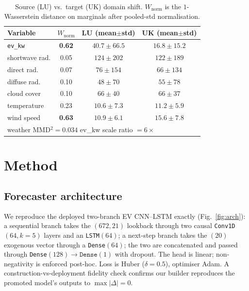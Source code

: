 \documentclass[conference]{IEEEtran}
\begin{document}
\begin{table}[t]
\centering
\caption{Source (LU) vs.\ target (UK) domain shift. $W_{\mathrm{norm}}$ is the
$1$-Wasserstein distance on marginals after pooled-std normalisation.}
\label{tab:domain}
\begin{tabular}{lccc}
\toprule
Variable & $W_{\mathrm{norm}}$ & LU (mean$\pm$std) & UK (mean$\pm$std)\\
\midrule
\texttt{ev\_kw}            & \textbf{0.62} & $40.7\pm66.5$ & $16.8\pm15.2$\\
shortwave rad.             & 0.05 & $124\pm202$ & $122\pm189$\\
direct rad.                & 0.07 & $76\pm154$  & $66\pm134$\\
diffuse rad.               & 0.10 & $48\pm70$   & $55\pm78$\\
cloud cover                & 0.10 & $66\pm40$   & $66\pm37$\\
temperature                & 0.23 & $10.6\pm7.3$& $11.2\pm5.9$\\
wind speed                 & \textbf{0.63} & $10.9\pm6.1$& $15.6\pm7.8$\\
\midrule
\multicolumn{4}{l}{weather MMD$^2=0.034$ \quad ev\_kw scale ratio $=6\times$}\\
\bottomrule
\end{tabular}
\end{table}

\section{Method}
\subsection{Forecaster architecture}
We reproduce the deployed two-branch EV CNN--LSTM exactly
(Fig.~\ref{fig:arch}): a sequential branch takes the $(672,21)$ lookback through
two causal \texttt{Conv1D}$(64,k{=}5)$ layers and an \texttt{LSTM}$(64)$; a
next-step branch takes the $(20)$ exogenous vector through a
\texttt{Dense}$(64)$; the two are concatenated and passed through
\texttt{Dense}$(128)\!\rightarrow\!\texttt{Dense}(1)$ with dropout. The head is
linear; non-negativity is enforced post-hoc. Loss is Huber ($\delta{=}0.5$),
optimiser Adam. A construction-vs-deployment fidelity check confirms our builder
reproduces the promoted model's outputs to $\max|\Delta|=0$.
\end{document}
